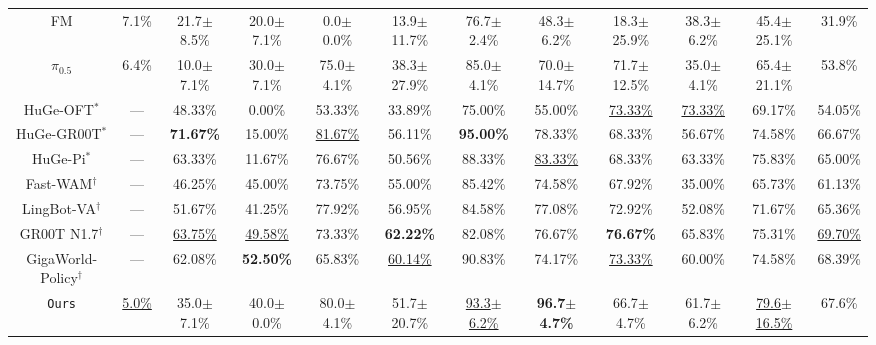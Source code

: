 \begin{table}[H]
\begin{adjustbox}{max width=\textwidth}
\begin{tabular}{cccccc|cccccc}
  FM
  & 7.1\%
  & 21.7$\pm$8.5\%
  & 20.0$\pm$7.1\%
  & 0.0$\pm$0.0\%
  & 13.9$\pm$11.7\%
  & 76.7$\pm$2.4\%
  & 48.3$\pm$6.2\%
  & 18.3$\pm$25.9\%
  & 38.3$\pm$6.2\%
  & 45.4$\pm$25.1\%
  & 31.9\% \\

  $\pi_{0.5}$
  & 6.4\%
  & 10.0$\pm$7.1\%
  & 30.0$\pm$7.1\%
  & 75.0$\pm$4.1\%
  & 38.3$\pm$27.9\%
  & 85.0$\pm$4.1\%
  & 70.0$\pm$14.7\%
  & 71.7$\pm$12.5\%
  & 35.0$\pm$4.1\%
  & 65.4$\pm$21.1\%
  & 53.8\% \\

  HuGe-OFT$^{*}$
  & ---
  & 48.33\%
  & 0.00\%
  & 53.33\%
  & 33.89\%
  & 75.00\%
  & 55.00\%
  & \underline{73.33\%}
  & \underline{73.33\%}
  & 69.17\%
  & 54.05\% \\

  HuGe-GR00T$^{*}$
  & ---
  & \textbf{71.67\%}
  & 15.00\%
  & \underline{81.67\%}
  & 56.11\%
  & \textbf{95.00\%}
  & 78.33\%
  & 68.33\%
  & 56.67\%
  & 74.58\%
  & 66.67\% \\

  HuGe-Pi$^{*}$
  & ---
  & 63.33\%
  & 11.67\%
  & 76.67\%
  & 50.56\%
  & 88.33\%
  & \underline{83.33\%}
  & 68.33\%
  & 63.33\%
  & 75.83\%
  & 65.00\% \\

  Fast-WAM$^{\dagger}$
  & ---
  & 46.25\%
  & 45.00\%
  & 73.75\%
  & 55.00\%
  & 85.42\%
  & 74.58\%
  & 67.92\%
  & 35.00\%
  & 65.73\%
  & 61.13\% \\

  LingBot-VA$^{\dagger}$
  & ---
  & 51.67\%
  & 41.25\%
  & 77.92\%
  & 56.95\%
  & 84.58\%
  & 77.08\%
  & 72.92\%
  & 52.08\%
  & 71.67\%
  & 65.36\% \\

  GR00T N1.7$^{\dagger}$
  & ---
  & \underline{63.75\%}
  & \underline{49.58\%}
  & 73.33\%
  & \textbf{62.22\%}
  & 82.08\%
  & 76.67\%
  & \textbf{76.67\%}
  & 65.83\%
  & 75.31\%
  & \underline{69.70\%} \\

  GigaWorld-Policy$^{\dagger}$
  & ---
  & 62.08\%
  & \textbf{52.50\%}
  & 65.83\%
  & \underline{60.14\%}
  & 90.83\%
  & 74.17\%
  & \underline{73.33\%}
  & 60.00\%
  & 74.58\%
  & 68.39\% \\

  \rowcolor{hclbrown!8!white}
  \texttt{Ours}
  & \underline{5.0\%}
  & 35.0$\pm$7.1\%
  & 40.0$\pm$0.0\%
  & 80.0$\pm$4.1\%
  & 51.7$\pm$20.7\%
  & \underline{93.3$\pm$6.2\%}
  & \textbf{96.7$\pm$4.7\%}
  & 66.7$\pm$4.7\%
  & 61.7$\pm$6.2\%
  & \underline{79.6$\pm$16.5\%}
  & 67.6\% \\


\end{tabular}
\end{adjustbox}
\end{table}
